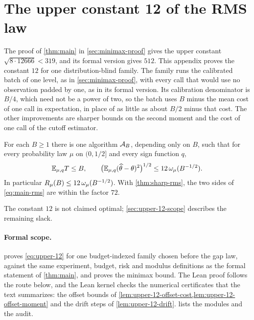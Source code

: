 \section{The upper constant 12 of the RMS law}
\label{app:upper-12}

The proof of \cref{thm:main} in \cref{sec:minimax-proof} gives the upper
constant $\sqrt{8\cdot12666}<319$, and its formal version gives $512$.
This appendix proves the constant $12$ for one distribution-blind family.
The family runs the calibrated batch of one level, as in
\cref{sec:minimax-proof}, with every call that would use no observation
padded by one, as in its formal version. Its calibration denominator is
$B/4$, which need not be a power of two, so the batch uses $B$ minus the mean
cost of one call in expectation, in place of as little as about $B/2$ minus
that cost. The other
improvements are sharper bounds on the second moment and the cost of one call
of the cutoff estimator.

\begin{theorem}\label{thm:upper-12}
For each $B\ge1$ there is one algorithm $\mathcal A_B$, depending only on $B$,
such that for every probability law $\mu$ on $(0,1/2]$ and every sign
function $q$,
\begin{equation}\label{eq:upper-12}
 \mathbb E_{\mu,q}T\le B,\qquad
 \bigl(\mathbb E_{\mu,q}(\widehat\theta-\theta)^2\bigr)^{1/2}\le12\,\omega_\mu(B^{-1/2}).
\end{equation}
In particular $R_\mu(B)\le12\,\omega_\mu(B^{-1/2})$. With \cref{thm:sharp-rms},
the two sides of \eqref{eq:main-rms} are within the factor $72$.
\end{theorem}

The constant $12$ is not claimed optimal; \cref{sec:upper-12-scope}
describes the remaining slack.

\paragraph{Formal scope.}
 proves
\eqref{eq:upper-12} for one budget-indexed family chosen before the gap
law, against the same experiment, budget, risk and modulus definitions as
the formal statement of \cref{thm:main}, and
 proves the
minimax bound. The Lean proof follows the route below, and the Lean kernel
checks the numerical certificates that the text summarizes: the offset
bounds of \cref{lem:upper-12-offset-cost,lem:upper-12-offset-moment} and
the drift steps of \cref{lem:upper-12-drift}.
 lists the modules and the audit.

